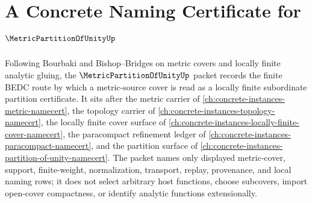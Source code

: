 \chapter{A Concrete Naming Certificate for $\MetricPartitionOfUnityUp$}
\label{ch:concrete-instances-metric-partition-of-unity-namecert}

Following Bourbaki and Bishop--Bridges on metric covers and locally finite analytic gluing, the $\MetricPartitionOfUnityUp$ packet records the finite BEDC route by which a metric-source cover is read as a locally finite subordinate partition certificate. It sits after the metric carrier of \autoref{ch:concrete-instances-metric-namecert}, the topology carrier of \autoref{ch:concrete-instances-topology-namecert}, the locally finite cover surface of \autoref{ch:concrete-instances-locally-finite-cover-namecert}, the paracompact refinement ledger of \autoref{ch:concrete-instances-paracompact-namecert}, and the partition surface of \autoref{ch:concrete-instances-partition-of-unity-namecert}. The packet names only displayed metric-cover, support, finite-weight, normalization, transport, replay, provenance, and local naming rows; it does not select arbitrary host functions, choose subcovers, import open-cover compactness, or identify analytic functions extensionally.

